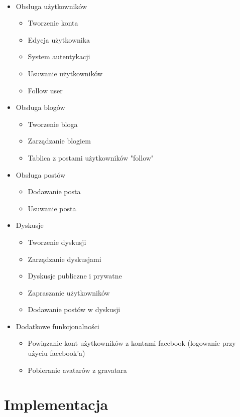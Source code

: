 \documentclass[wide,a4paper,titlepage,12pt] {article}
\begin{document}
  \paragraph{}
  \begin{itemize}
   \item Obsługa użytkowników
   \begin{itemize}
    \item Tworzenie konta
    \item Edycja użytkownika
    \item System autentykacji
    \item Usuwanie użytkowników
    \item Follow user
   \end{itemize}
   \item Obsługa blogów
    \begin{itemize}
      \item Tworzenie bloga
      \item Zarządzanie blogiem
      \item Tablica z postami użytkowników "follow"
    \end{itemize}
   \item Obsługa postów
    \begin{itemize}
      \item Dodawanie posta
      \item Usuwanie posta
    \end{itemize}
  \item Dyskusje
    \begin{itemize}
      \item Tworzenie dyskusji
      \item Zarządzanie dyskusjami
      \item Dyskusje publiczne i prywatne
      \item Zapraszanie użytkowników
      \item Dodawanie postów w dyskusji
    \end{itemize}
  \item Dodatkowe funkcjonalności
    \begin{itemize}
      \item Powiązanie kont użytkowników z kontami facebook (logowanie przy użyciu facebook'a)
      \item Pobieranie avatarów z gravatara
    \end{itemize}
  \end{itemize}
  \section{Implementacja}
\end{document}
